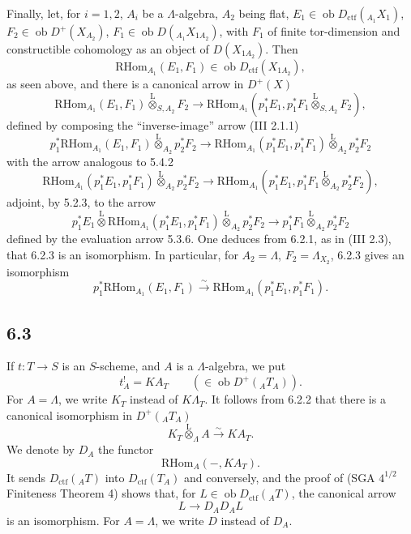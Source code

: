 \documentclass[11pt]{article}
\providecommand{\RHom}{\mathrm{RHom}}
\providecommand{\lten}{\overset{\mathrm L}{\otimes}}
\providecommand{\Ob}{\operatorname{ob}}
\providecommand{\RHom}{\mathrm{RHom}}
\providecommand{\lten}{\overset{\mathrm L}{\otimes}}
\providecommand{\RHom}{\mathrm R\mathcal{H}om}
\providecommand{\lten}{\overset{\mathrm L}{\otimes}}
\providecommand{\Ob}{\operatorname{ob}}
\providecommand{\lten}{\overset{\mathrm L}{\otimes}}
\providecommand{\lten}{\overset{\mathrm L}{\otimes}}
\providecommand{\Ob}{\operatorname{Ob}}
\providecommand{\lten}{\overset{\mathrm L}{\otimes}}
\providecommand{\RHom}{\mathrm{RHom}}
\begin{document}
Finally, let, for $i=1,2$, $A_i$ be a $\Lambda$-algebra, $A_2$ being flat, $E_1\in\Ob D_{\mathrm{ctf}}({}_{A_1}X_1)$, $F_2\in\Ob D^+(X_{A_2})$, $F_1\in\Ob D({}_{A_1}X_{1A_2})$, with $F_1$ of finite tor-dimension and constructible cohomology as an object of $D(X_{1A_2})$. Then
\[
\RHom_{A_1}(E_1,F_1)\in\Ob D_{\mathrm{ctf}}(X_{1A_2}),
\]
as seen above, and there is a canonical arrow in $D^+(X)$
\begin{equation}
\RHom_{A_1}(E_1,F_1)\lten_{S,A_2}F_2
\longrightarrow
\RHom_{A_1}(p_1^*E_1,p_1^*F_1\lten_{S,A_2}F_2),
\tag{6.2.3}
\end{equation}
defined by composing the “inverse-image” arrow (III 2.1.1)
\[
p_1^*\RHom_{A_1}(E_1,F_1)\lten_{A_2}p_2^*F_2
\longrightarrow
\RHom_{A_1}(p_1^*E_1,p_1^*F_1)\lten_{A_2}p_2^*F_2
\]
with the arrow analogous to 5.4.2
\[
\RHom_{A_1}(p_1^*E_1,p_1^*F_1)\lten_{A_2}p_2^*F_2
\longrightarrow
\RHom_{A_1}(p_1^*E_1,p_1^*F_1\lten_{A_2}p_2^*F_2),
\]
adjoint, by 5.2.3, to the arrow
\[
p_1^*E_1\lten\RHom_{A_1}(p_1^*E_1,p_1^*F_1)\lten_{A_2}p_2^*F_2
\longrightarrow
p_1^*F_1\lten_{A_2}p_2^*F_2
\]
defined by the evaluation arrow 5.3.6. One deduces from 6.2.1, as in (III 2.3), that 6.2.3 is an isomorphism. In particular, for $A_2=\Lambda$, $F_2=\Lambda_{X_2}$, 6.2.3 gives an isomorphism
\begin{equation}
p_1^*\RHom_{A_1}(E_1,F_1)
\xrightarrow{\sim}
\RHom_{A_1}(p_1^*E_1,p_1^*F_1).
\tag{6.2.4}
\end{equation}

\subsection*{6.3}
If $t:T\to S$ is an $S$-scheme, and $A$ is a $\Lambda$-algebra, we put
\begin{equation}
t_A^! = KA_T \qquad(\in\Ob D^+({}_AT_A)).
\tag{6.3.1}
\end{equation}
For $A=\Lambda$, we write $K_T$ instead of $K\Lambda_T$. It follows from 6.2.2 that there is a canonical isomorphism in $D^+({}_AT_A)$
\begin{equation}
K_T\lten_{\Lambda}A\xrightarrow{\sim}KA_T.
\tag{6.3.2}
\end{equation}
We denote by $D_A$ the functor
\[
\RHom_A(-,KA_T).
\]
It sends $D_{\mathrm{ctf}}({}_AT)$ into $D_{\mathrm{ctf}}(T_A)$ and conversely, and the proof of (SGA $4^{1/2}$ Finiteness Theorem 4) shows that, for $L\in\Ob D_{\mathrm{ctf}}({}_AT)$, the canonical arrow
\[
L\longrightarrow D_AD_AL
\]
is an isomorphism. For $A=\Lambda$, we write $D$ instead of $D_A$.
\end{document}
